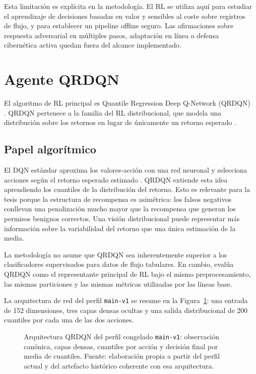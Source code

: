 Esta limitación es explícita en la metodología. El RL se utiliza aquí para estudiar el aprendizaje de decisiones basadas en valor y sensibles al coste sobre registros de flujo, y para establecer un pipeline offline seguro. Las afirmaciones sobre respuesta adversarial en múltiples pasos, adaptación en línea o defensa cibernética activa quedan fuera del alcance implementado.

\section{Agente QRDQN}
El algoritmo de RL principal es Quantile Regression Deep Q-Network (QRDQN) \parencite{Dabney2018QRDQN}. QRDQN pertenece a la familia del RL distribucional, que modela una distribución sobre los retornos en lugar de únicamente un retorno esperado \parencite{Bellemare2017DistributionalRL}.

\subsection{Papel algorítmico}
El DQN estándar aproxima los valores-acción con una red neuronal y selecciona acciones según el retorno esperado estimado \parencite{Mnih2015DQN}. QRDQN extiende esta idea aprendiendo los cuantiles de la distribución del retorno. Esto es relevante para la tesis porque la estructura de recompensa es asimétrica: los falsos negativos conllevan una penalización mucho mayor que la recompensa que generan los permisos benignos correctos. Una visión distribucional puede representar más información sobre la variabilidad del retorno que una única estimación de la media.

La metodología no asume que QRDQN sea inherentemente superior a los clasificadores supervisados para datos de flujo tabulares. En cambio, evalúa QRDQN como el representante principal de RL bajo el mismo preprocesamiento, las mismas particiones y las mismas métricas utilizadas por las líneas base.

La arquitectura de red del perfil \texttt{main-v1} se resume en la Figura~\ref{fig:arquitectura-qrdqn}: una entrada de 152 dimensiones, tres capas densas ocultas y una salida distribucional de 200 cuantiles por cada una de las dos acciones.

\begin{figure}[htbp]
\centering
\resizebox{\textwidth}{!}{}
\caption[Arquitectura QRDQN del perfil main-v1]{Arquitectura QRDQN del perfil congelado \texttt{main-v1}: observación canónica, capas densas, cuantiles por acción y decisión final por media de cuantiles. Fuente: elaboración propia a partir del perfil actual y del artefacto histórico coherente con esa arquitectura.}
\label{fig:arquitectura-qrdqn}
\end{figure}

